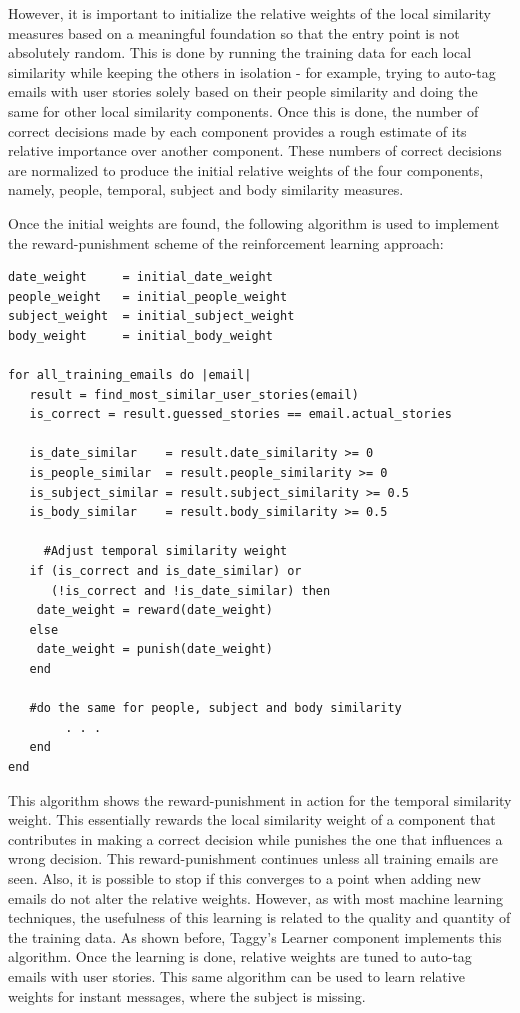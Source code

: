 However, it is important to initialize the relative weights of the local similarity measures based on a meaningful foundation so that the entry point is not absolutely random. This is done by running the training data for each local similarity while keeping the others in isolation - for example, trying to auto-tag emails with user stories solely based on their people similarity and doing the same for other local similarity components. Once this is done, the number of correct decisions made by each component provides a rough estimate of its relative importance over another component. These numbers of correct decisions are normalized to produce the initial relative weights of the four components, namely, people, temporal, subject and body similarity measures.

Once the initial weights are found, the following algorithm is used to implement the reward-punishment scheme of the reinforcement learning approach:

\pagebreak
\begin{verbatim}
date_weight     = initial_date_weight
people_weight   = initial_people_weight
subject_weight  = initial_subject_weight
body_weight     = initial_body_weight

for all_training_emails do |email|
   result = find_most_similar_user_stories(email)
   is_correct = result.guessed_stories == email.actual_stories
	
   is_date_similar    = result.date_similarity >= 0
   is_people_similar  = result.people_similarity >= 0
   is_subject_similar = result.subject_similarity >= 0.5
   is_body_similar    = result.body_similarity >= 0.5

	 #Adjust temporal similarity weight
   if (is_correct and is_date_similar) or 
      (!is_correct and !is_date_similar) then
    date_weight = reward(date_weight)
   else
    date_weight = punish(date_weight)
   end

   #do the same for people, subject and body similarity
		. . .		
   end
end
\end{verbatim}
This algorithm shows the reward-punishment in action for the temporal similarity weight. This essentially rewards the local similarity weight of a component that contributes in making a correct decision while punishes the one that influences a wrong decision. This reward-punishment continues unless all training emails are seen. Also, it is possible to stop if this converges to a point when adding new emails do not alter the relative weights. However, as with most machine learning techniques, the usefulness of this learning is related to the quality and quantity of the training data. As shown before, Taggy's Learner component implements this algorithm. Once the learning is done, relative weights are tuned to auto-tag emails with user stories. This same algorithm can be used to learn relative weights for instant messages, where the subject is missing.

